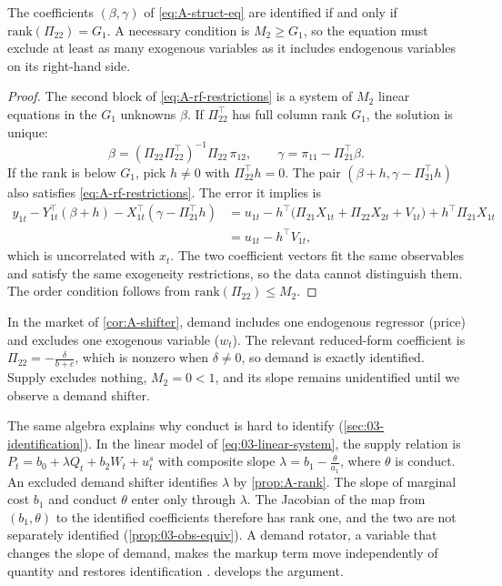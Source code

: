 \begin{proposition}\label{prop:A-rank}
The coefficients $(\beta, \gamma)$ of \eqref{eq:A-struct-eq} are identified if and only if
$\mathrm{rank}(\Pi_{22}) = G_1$. A necessary condition is $M_2 \ge G_1$, so the equation must exclude at least
as many exogenous variables as it includes endogenous variables on its right-hand side.
\end{proposition}

\begin{proof}
The second block of \eqref{eq:A-rf-restrictions} is a system of $M_2$ linear equations in the $G_1$ unknowns
$\beta$. If $\Pi_{22}^\top$ has full column rank $G_1$, the solution is unique:
\begin{equation*}
\beta = (\Pi_{22}\Pi_{22}^\top)^{-1}\Pi_{22}\,\pi_{12}, \qquad \gamma = \pi_{11} - \Pi_{21}^\top\beta .
\end{equation*}
If the rank is below $G_1$, pick $h \neq 0$ with $\Pi_{22}^\top h = 0$. The pair
$(\beta + h, \gamma - \Pi_{21}^\top h)$ also satisfies \eqref{eq:A-rf-restrictions}. The error it implies is
\begin{align*}
y_{1t} - Y_{1t}^\top(\beta + h) - X_{1t}^\top(\gamma - \Pi_{21}^\top h)
&= u_{1t} - h^\top\bigl(\Pi_{21}X_{1t} + \Pi_{22}X_{2t} + V_{1t}\bigr) + h^\top\Pi_{21}X_{1t} \\
&= u_{1t} - h^\top V_{1t} ,
\end{align*}
which is uncorrelated with $x_t$. The two coefficient vectors fit the same observables and satisfy the same
exogeneity restrictions, so the data cannot distinguish them. The order condition follows from
$\mathrm{rank}(\Pi_{22}) \le M_2$.
\end{proof}

In the market of \cref{cor:A-shifter}, demand includes one endogenous regressor (price) and excludes one
exogenous variable ($w_t$). The relevant reduced-form coefficient is $\Pi_{22} = -\frac{\delta}{b + c}$, which
is nonzero when $\delta \neq 0$, so demand is exactly identified. Supply excludes nothing, $M_2 = 0 < 1$, and
its slope remains unidentified until we observe a demand shifter.

The same algebra explains why conduct is hard to identify (\cref{sec:03-identification}). In the linear model
of \cref{eq:03-linear-system}, the supply relation is $P_t = b_0 + \lambda Q_t + b_2 W_t + u^s_t$ with composite
slope $\lambda = b_1 - \frac{\theta}{a_1}$, where $\theta$ is conduct. An excluded demand shifter identifies
$\lambda$ by \cref{prop:A-rank}. The slope of marginal cost $b_1$ and conduct $\theta$ enter only through
$\lambda$. The Jacobian of the map from $(b_1, \theta)$ to the identified coefficients therefore has rank one,
and the two are not separately identified (\cref{prop:03-obs-equiv}). A demand rotator, a variable that changes
the slope of demand, makes the markup term move independently of quantity and restores identification
\citep{Bresnahan1982,Lau1982}.  develops the argument.

